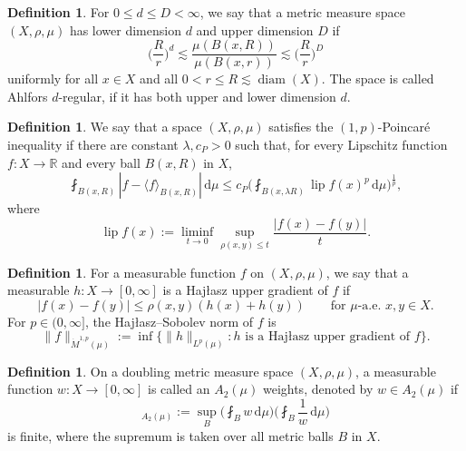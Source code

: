 \documentclass[reqno]{amsart}
\newcommand{\ud}[0]{\,\mathrm{d}}
\newcommand{\abs}[1]{|#1|}
\newcommand{\Norm}[2]{\|#1\|_{#2}}
\newcommand{\ave}[1]{\langle #1\rangle}
\newcommand{\R}{\mathbb{R}}
\theoremstyle{plain}
\theoremstyle{definition}
\newtheorem{definition}[equation]{Definition}
\theoremstyle{remark}
\begin{document}
\begin{definition}\label{def:Ahlfors}
For $0\leq d\leq D<\infty$, we say that a metric measure space $(X,\rho,\mu)$ has lower dimension $d$ and upper dimension $D$ if
\begin{equation*}
  \Big(\frac{R}{r}\Big)^d\lesssim\frac{\mu(B(x,R))}{\mu(B(x,r))}\lesssim\Big(\frac{R}{r}\Big)^D
\end{equation*}
uniformly for all $x\in X$ and all $0<r\leq R\lesssim\operatorname{diam}(X)$.
The space is called Ahlfors $d$-regular, if it has both upper and lower dimension $d$.
\end{definition}


\begin{definition}\label{def:Poincare}
We say that a space $(X,\rho,\mu)$ satisfies the $(1,p)$-Poincar\'e inequality if there are constant $\lambda,c_P>0$ such that, for every Lipschitz function $f:X\to\R$ and every ball $B(x,R)$ in $X$,
\begin{equation*}
  \fint_{B(x,R)}\abs{f-\ave{f}_{B(x,R)}}\ud\mu
  \leq c_P\Big(\fint_{B(x,\lambda R)}\operatorname{lip}f(x)^p \ud\mu\Big)^{\frac1p},
\end{equation*}
where
\begin{equation*}
  \operatorname{lip}f(x):=\liminf_{t\to 0}\sup_{\rho(x,y)\leq t}\frac{\abs{f(x)-f(y)}}{t}.
\end{equation*}
\end{definition}


\begin{definition}\label{def:Hajlasz}
For a measurable function $f$ on $(X,\rho,\mu)$, we say that a measurable $h:X\to[0,\infty]$ is a Haj\l{}asz upper gradient of $f$ if
\begin{equation*}
  \abs{f(x)-f(y)}\leq\rho(x,y)(h(x)+h(y))\qquad\text{for $\mu$-a.e. }x,y\in X.
\end{equation*}
For $p\in(0,\infty]$, the Haj\l{}asz--Sobolev norm of $f$ is
\begin{equation*}
  \Norm{f}{\dot M^{1,p}(\mu)}
  :=\inf\Big\{\Norm{h}{L^p(\mu)}: h\text{ is a Haj\l{}asz upper gradient of }f\Big\}.
\end{equation*}
\end{definition}

\begin{definition}\label{def:A2}
On a doubling metric measure space $(X,\rho,\mu)$, a measurable function $w:X\to[0,\infty]$ is called an $A_2(\mu)$ weights, denoted by $w\in A_2(\mu)$ if
\begin{equation*}
  [w]_{A_2(\mu)}:=\sup_B\Big(\fint_B w\ud\mu\Big)\Big(\fint_B\frac{1}{w}\ud\mu\Big)
\end{equation*}
is finite, where the supremum is taken over all metric balls $B$ in $X$.
\end{definition}
\end{document}
